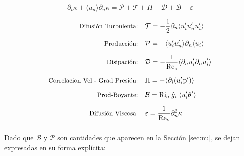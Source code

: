 \begin{equation}
\partial_t \kappa + \langle u_n \rangle \partial_n \kappa = \mathcal{P} + \mathcal{T} + \Pi + \mathcal{D} + \mathcal{B} - \varepsilon
\label{eq:tke-bud}
\end{equation}

\vspace*{-0.5cm}

\begin{equation}
\begin{aligned}
\mbox{\small Difusión Turbulenta:}\quad 
& \mathcal{T} = - \frac{1}{2} \partial_n \langle u'_i u'_n u'_i \rangle \\[2mm]
\mbox{\small Producción:}\quad 
& \mathcal{P} = - \langle u'_i u'_n \rangle \partial_n \langle u_i \rangle \\[2mm]
\mbox{\small Disipación:}\quad 
& \mathcal{D} = - \frac{1}{\text{Re}_o} \langle \partial_n u'_i \partial_n u'_i \rangle \\[2mm]
\mbox{\small Correlacion Vel - Grad Presión:}\quad 
& \Pi = - \langle \partial_i (u'_i \hspace{0.1mm} \text{p}') \rangle \\[2mm]
\mbox{\small Prod-Boyante:}\quad 
& \mathcal{B} = \text{Ri}_o \hspace{1mm} \hat{g}_i \hspace{1mm} \langle u'_i \theta' \rangle \\[2mm]
\mbox{\small Difusión Viscosa:}\quad 
& \varepsilon = \frac{1}{\text{Re}_o} \partial^2_n \kappa \\[2mm]
\end{aligned}
\end{equation}

Dado que $\mathcal{B}$ y $\mathcal{P}$ son cantidades que aparecen en la Sección \ref{sec:nu}, se dejan expresadas en su forma explícita:

